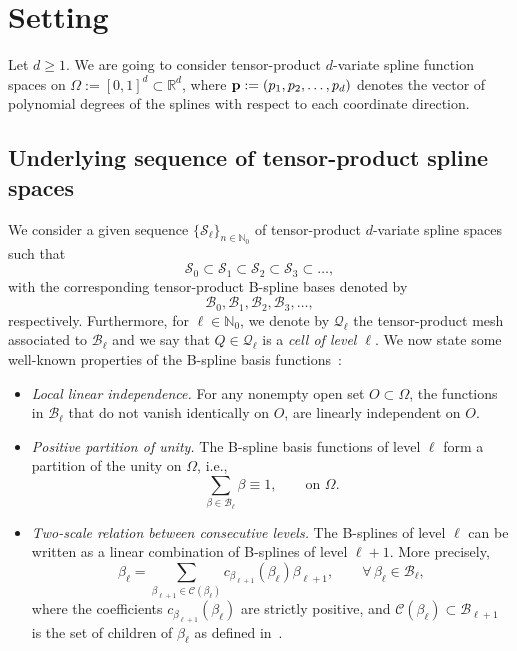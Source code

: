 \documentclass[a4paper]{siamltex1213}
\newcommand\NN{\mathbb N}
\newcommand\BB{\mathcal B}
\newcommand\QQ{\mathcal Q}
\newcommand\VV{\mathcal S}
\newcommand\CC{\mathcal C}
\newcommand{\RR}{\mathbb R}
\begin{document}
\section{Setting}

Let $d\ge 1$. We are going to consider tensor-product $d$-variate spline function spaces on $\Omega:=[0,1]^d\subset \RR^d$, where ${\bf p}:=(p_1,p_2,\dots,p_d)$ denotes the vector of polynomial degrees of the splines with respect to each coordinate direction.

\subsection{Underlying sequence of tensor-product spline spaces}

We consider a given sequence $\{\VV_\ell\}_{n\in\NN_0}$ of tensor-product $d$-variate spline spaces such that
\begin{equation}\label{E:tensor-product spaces}
 \VV_0\subset \VV_1\subset \VV_2\subset\VV_3\subset\dots,
\end{equation}
with the corresponding tensor-product B-spline bases denoted by
\begin{equation}\label{E:tensor-product basis}
 \BB_0,  \BB_1,  \BB_2, \BB_3,\dots,
\end{equation}
respectively. %
Furthermore, for $\ell\in\NN_0$, we denote by $\QQ_\ell$ the tensor-product mesh associated to $\BB_\ell$ and we say that $Q\in\QQ_\ell$ is a \emph{cell of level $\ell$}. We now state some well-known properties of the B-spline basis functions~\cite{DeBoor,Schumi}:
\begin{itemize}
\item \emph{Local linear independence.} For any nonempty open set $O\subset\Omega$, the functions in $\BB_\ell$ that do not vanish identically on $O$, are linearly independent on $O$.
\item \emph{Positive partition of unity.} The B-spline basis functions of level $\ell$ form a partition of the unity 
on $\Omega$, i.e.,
 \begin{equation}\label{E:partition of unity in B_0}
  \sum_{\beta\in\BB_\ell} \beta \equiv 1,\qquad\text{on }\Omega.
 \end{equation}
\item \emph{Two-scale relation between consecutive levels.} The B-splines of level $\ell$ can be written as a linear combination of B-splines of level $\ell+1$. More precisely, 
\begin{equation}\label{E:two scale relation}
 \beta_\ell = \sum_{\beta_{\ell+1}\in\CC(\beta_{\ell})} 
c_{\beta_{\ell+1}}(\beta_\ell)\beta_{\ell+1}, 
\qquad \forall\,\beta_\ell\in\BB_\ell,
\end{equation}
where the coefficients $c_{\beta_{\ell+1}}(\beta_\ell)$ are strictly positive, and $\CC(\beta_\ell)\subset\BB_{\ell+1}$ is the set of children of $\beta_\ell$ as defined in~\cite{BG15}. 
\end{itemize}
\end{document}
